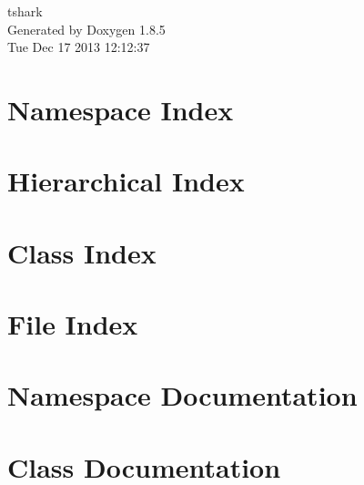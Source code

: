 \documentclass[twoside]{book}
\newcommand{\clearemptydoublepage}{%
  \newpage{\pagestyle{empty}\cleardoublepage}%
}
\begin{document}
\hypersetup{pageanchor=false}
\begin{titlepage}
\vspace*{7cm}
\begin{center}%
{\Large tshark }\\
\vspace*{1cm}
{\large Generated by Doxygen 1.8.5}\\
\vspace*{0.5cm}
{\small Tue Dec 17 2013 12:12:37}\\
\end{center}
\end{titlepage}
\clearemptydoublepage
\tableofcontents
\clearemptydoublepage
{}
\hypersetup{pageanchor=true}

\chapter{Namespace Index}

\chapter{Hierarchical Index}

\chapter{Class Index}

\chapter{File Index}

\chapter{Namespace Documentation}


















\chapter{Class Documentation}




















\end{document}
